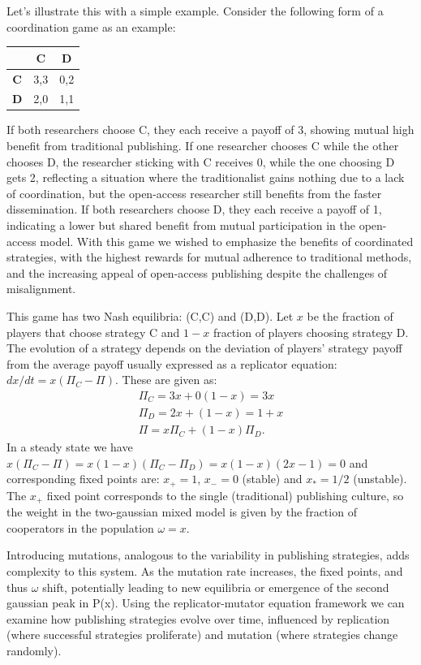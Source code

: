 \documentclass[amsfonts, amssymb, prl, superscriptaddress, notitlepage, twocolumn, nofootinbib]{revtex4-2}
\begin{document}
 Let's illustrate this with a simple example. Consider the following form of a coordination game as an example: 
 \begin{table}[H]
\centering
\begin{tabular}{c|cc}
    & \textbf{C} & \textbf{D} \\ \hline
    \textbf{C} & 3,3 & 0,2 \\ 
    \textbf{D} & 2,0 & 1,1 \\ 
\end{tabular}
\end{table}

 If both researchers choose C, they each receive a payoff of 3, showing mutual high benefit from traditional publishing. If one researcher chooses C while the other chooses D, the researcher sticking with C receives 0, while the one choosing D gets 2, reflecting a situation where the traditionalist gains nothing due to a lack of coordination, but the open-access researcher still benefits from the faster dissemination. If both researchers choose D, they each receive a payoff of 1, indicating a lower but shared benefit from mutual participation in the open-access model. With this game we wished to emphasize the benefits of coordinated strategies, with the highest rewards for mutual adherence to traditional methods, and the increasing appeal of open-access publishing despite the challenges of misalignment.

This game has two Nash equilibria: (C,C) and (D,D). Let $x$ be the fraction of players that choose strategy C and $1-x$ fraction of players choosing strategy D. The evolution of a strategy depends on the deviation of players' strategy payoff from the average payoff usually expressed as a replicator equation: $dx/dt = x(\Pi_C-\Pi)$. These are given as:
\begin{eqnarray}
    \Pi_C = 3x + 0(1-x) = 3x \\
    \Pi_D = 2x + (1-x) = 1+x \\
    \Pi = x\Pi_C + (1-x)\Pi_D.
\end{eqnarray}
In a steady state we have $x(\Pi_C-\Pi)=x(1-x)(\Pi_C-\Pi_D)=x(1-x)(2x-1)=0$ and corresponding fixed points are: $x_+=1$, $x_-=0$ (stable) and $x_* = 1/2$ (unstable). The $x_+$ fixed point corresponds to the single (traditional) publishing culture, so the weight in the two-gaussian mixed model is given by the fraction of cooperators in the population $\omega=x$. 

Introducing mutations, analogous to the variability in publishing strategies, adds complexity to this system. As the mutation rate increases, the fixed points, and thus $\omega$ shift, potentially leading to new equilibria or emergence of the second gaussian peak in P(x). Using the replicator-mutator equation framework we can examine how publishing strategies evolve over time, influenced by replication (where successful strategies proliferate) and mutation (where strategies change randomly). 
\end{document}
